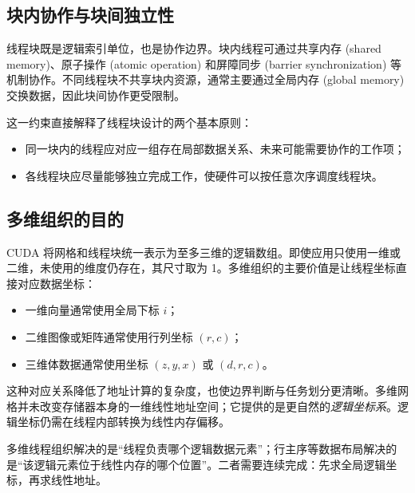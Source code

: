 \subsection{块内协作与块间独立性}

线程块既是逻辑索引单位，也是协作边界。块内线程可通过共享内存 (shared memory)、原子操作 (atomic operation) 和屏障同步 (barrier synchronization) 等机制协作。不同线程块不共享块内资源，通常主要通过全局内存 (global memory) 交换数据，因此块间协作更受限制。

这一约束直接解释了线程块设计的两个基本原则：
\begin{itemize}
  \item 同一块内的线程应对应一组存在局部数据关系、未来可能需要协作的工作项；
  \item 各线程块应尽量能够独立完成工作，使硬件可以按任意次序调度线程块。
\end{itemize}

\subsection{多维组织的目的}

CUDA 将网格和线程块统一表示为至多三维的逻辑数组。即使应用只使用一维或二维，未使用的维度仍存在，其尺寸取为 1。多维组织的主要价值是让线程坐标直接对应数据坐标：
\begin{itemize}
  \item 一维向量通常使用全局下标 $i$；
  \item 二维图像或矩阵通常使用行列坐标 $(r,c)$；
  \item 三维体数据通常使用坐标 $(z,y,x)$ 或 $(d,r,c)$。
\end{itemize}

这种对应关系降低了地址计算的复杂度，也使边界判断与任务划分更清晰。多维网格并未改变存储器本身的一维线性地址空间；它提供的是更自然的\emph{逻辑坐标系}。逻辑坐标仍需在线程内部转换为线性内存偏移。

\begin{keybox}
多维线程组织解决的是“线程负责哪个逻辑数据元素”；行主序等数据布局解决的是“该逻辑元素位于线性内存的哪个位置”。二者需要连续完成：先求全局逻辑坐标，再求线性地址。
\end{keybox}
